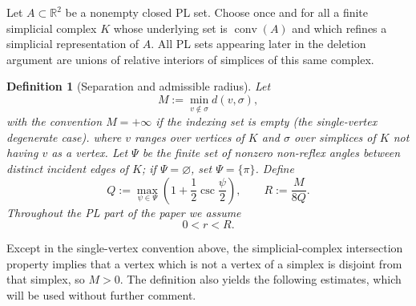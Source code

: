 \documentclass[11pt]{article}
\newtheorem{definition}[theorem]{Definition}
\newcommand{\R}{\mathbb R}
\DeclareMathOperator{\conv}{conv}
\numberwithin{equation}{section}
\begin{document}
Let $A\subset\R^2$ be a nonempty closed PL set. Choose once and for all a finite simplicial complex $K$ whose underlying set is $\conv(A)$ and which refines a simplicial representation of $A$. All PL sets appearing later in the deletion argument are unions of relative interiors of simplices of this same complex.

\begin{definition}[Separation and admissible radius]\label{def:MR}
Let
\[
M:=\min_{v\notin\sigma}d(v,\sigma),
\]
with the convention $M=+\infty$ if the indexing set is empty (the single-vertex degenerate case).
where $v$ ranges over vertices of $K$ and $\sigma$ over simplices of $K$ not having $v$ as a vertex. Let $\Psi$ be the finite set of nonzero non-reflex angles between distinct incident edges of $K$; if $\Psi=\varnothing$, set $\Psi=\{\pi\}$. Define
\[
Q:=\max_{\psi\in\Psi}\left(1+\frac12\csc\frac\psi2\right),
\qquad
\boxed{R:=\frac{M}{8Q}.}
\]
Throughout the PL part of the paper we assume
\[
0<r<R.
\]
\end{definition}

Except in the single-vertex convention above, the simplicial-complex intersection property implies that a vertex which is not a vertex of a simplex is disjoint from that simplex, so $M>0$. The definition also yields the following estimates, which will be used without further comment.
\end{document}
